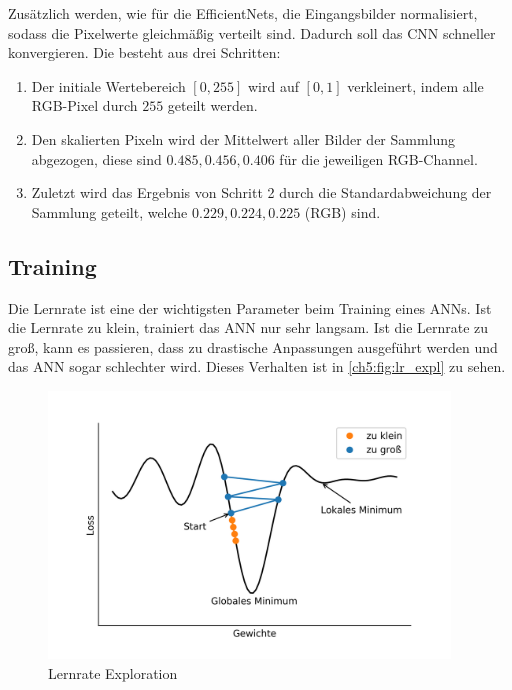Zusätzlich werden, wie für die  EfficientNets, die Eingangsbilder normalisiert, sodass die Pixelwerte gleichmäßig verteilt sind.
Dadurch soll das \ac{CNN} schneller konvergieren.
Die  besteht aus drei Schritten:
\begin{enumerate}
    \item Der initiale Wertebereich $[0,255]$ wird auf $[0,1]$ verkleinert, indem alle RGB-Pixel durch $255$ geteilt werden.
    \item Den skalierten Pixeln wird der Mittelwert aller Bilder der  Sammlung abgezogen, diese sind $0.485, 0.456, 0.406$ für die jeweiligen RGB-Channel.
    \item Zuletzt wird das Ergebnis von Schritt 2 durch die Standardabweichung der Sammlung geteilt, welche $0.229, 0.224, 0.225$ (RGB) sind.
\end{enumerate}

\subsection*{Training} \label{ch5:cnn:train}
Die Lernrate ist eine der wichtigsten Parameter beim Training eines \ac{ANN}s.
Ist die Lernrate zu klein, trainiert das \ac{ANN} nur sehr langsam.
Ist die Lernrate zu groß, kann es passieren, dass zu drastische Anpassungen ausgeführt  werden und das \ac{ANN} sogar schlechter wird.
Dieses Verhalten ist in \autoref{ch5:fig:lr_expl} zu sehen.

\begin{figure}[ht]
    \begin{small}
        \begin{center}
            \includegraphics[width=0.95\textwidth]{figures/ch5/lr_big_small}
        \end{center}
        \caption{Lernrate Exploration}
        \label{ch5:fig:lr_expl}
    \end{small}
\end{figure}

